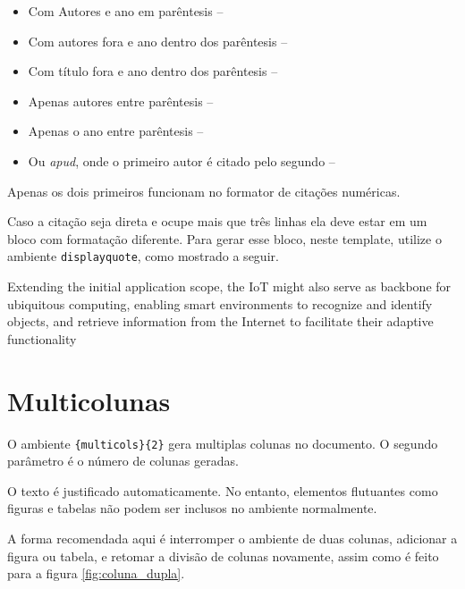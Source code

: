     \begin{itemize}
        \item Com Autores e ano em parêntesis -- \cite{wortmann2015internet}
        \item Com autores fora e ano dentro dos parêntesis -- \textcite{weber2010internet}
        \item Com título fora e ano dentro dos parêntesis -- 
        \item Apenas autores entre parêntesis -- \citeauthor{ashton2009internet}
        \item Apenas o ano entre parêntesis -- \citeyear{yoo2010research}
        \item Ou \textit{apud}, onde o primeiro autor é citado pelo segundo -- 
    \end{itemize}

    Apenas os dois primeiros funcionam no formator de citações numéricas.

    Caso a citação seja direta e ocupe mais que três linhas ela deve estar em um bloco com formatação diferente.
    Para gerar esse bloco, neste template, utilize o ambiente \lstinline[language=TeX,style=code]|displayquote|, como mostrado a seguir.


    \begin{displayquote}
    Extending the initial application scope, the IoT might also serve as backbone for
    ubiquitous computing, enabling smart environments to recognize and identify
     objects, and retrieve information from the Internet to facilitate their adaptive
    functionality
    \end{displayquote}


\section{Multicolunas}
\label{sec:multicolunas}


    \begin{multicols}{2}
        O ambiente \lstinline[language=TeX,style=code]|{multicols}{2}| gera multiplas colunas no documento.
        O segundo parâmetro é o número de colunas geradas.

        O texto é justificado automaticamente.
        No entanto, elementos flutuantes como figuras e tabelas não podem ser inclusos no ambiente normalmente.

        A forma recomendada aqui é interromper o ambiente de duas colunas, adicionar a figura ou tabela, e retomar a divisão de colunas novamente, assim como é feito para a figura \ref{fig:coluna_dupla}.
    \end{multicols}

